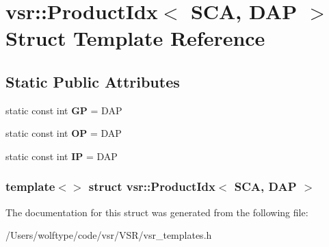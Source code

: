 \hypertarget{structvsr_1_1_product_idx_3_01_s_c_a_00_01_d_a_p_01_4}{\section{vsr\-:\-:Product\-Idx$<$ S\-C\-A, D\-A\-P $>$ Struct Template Reference}
\label{structvsr_1_1_product_idx_3_01_s_c_a_00_01_d_a_p_01_4}
}
\subsection*{Static Public Attributes}
\begin{DoxyCompactItemize}
\item 
\hypertarget{structvsr_1_1_product_idx_3_01_s_c_a_00_01_d_a_p_01_4_a65f48d4141036ed435892d01a8b5a053}{static const int {\bfseries G\-P} = D\-A\-P}\label{structvsr_1_1_product_idx_3_01_s_c_a_00_01_d_a_p_01_4_a65f48d4141036ed435892d01a8b5a053}

\item 
\hypertarget{structvsr_1_1_product_idx_3_01_s_c_a_00_01_d_a_p_01_4_aa766dbeb91193090bb3d5a9f4651ed23}{static const int {\bfseries O\-P} = D\-A\-P}\label{structvsr_1_1_product_idx_3_01_s_c_a_00_01_d_a_p_01_4_aa766dbeb91193090bb3d5a9f4651ed23}

\item 
\hypertarget{structvsr_1_1_product_idx_3_01_s_c_a_00_01_d_a_p_01_4_a5aa85f8ea3e3cbb81c7c39a526340c25}{static const int {\bfseries I\-P} = D\-A\-P}\label{structvsr_1_1_product_idx_3_01_s_c_a_00_01_d_a_p_01_4_a5aa85f8ea3e3cbb81c7c39a526340c25}

\end{DoxyCompactItemize}
\subsubsection*{template$<$$>$ struct vsr\-::\-Product\-Idx$<$ S\-C\-A, D\-A\-P $>$}



The documentation for this struct was generated from the following file\-:\begin{DoxyCompactItemize}
\item 
/\-Users/wolftype/code/vsr/\-V\-S\-R/vsr\-\_\-templates.\-h\end{DoxyCompactItemize}
